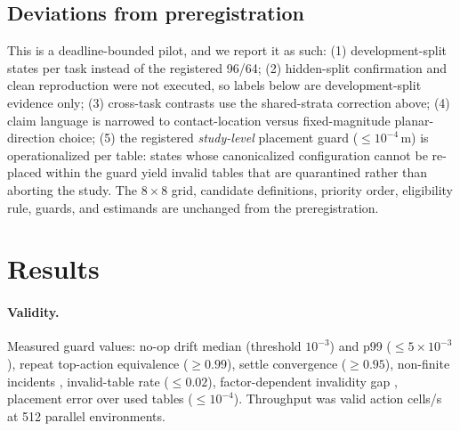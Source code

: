 \documentclass{article}
\begin{document}
\subsection{Deviations from preregistration}
This is a deadline-bounded pilot, and we report it as such:
(1) \nstatespertask{} development-split states per task instead of the
registered 96/64; (2) hidden-split confirmation and clean reproduction were
not executed, so labels below are development-split evidence only;
(3) cross-task contrasts use the shared-strata correction above;
(4) claim language is narrowed to contact-location versus fixed-magnitude
planar-direction choice; (5) the registered \emph{study-level} placement
guard ($\le 10^{-4}$\,m) is operationalized per table: states whose
canonicalized configuration cannot be re-placed within the guard yield
invalid tables that are quarantined rather than aborting the study. The
$8{\times}8$ grid, candidate definitions,
priority order, eligibility rule, guards, and estimands are unchanged from the
preregistration.

\section{Results}
\paragraph{Validity.}
\guardlead{} Measured guard values: no-op drift median \guardnoopmed{}
(threshold $10^{-3}$) and p99 \guardnooppninenine{} ($\le 5{\times}10^{-3}$),
repeat top-action equivalence \guardrepagree{} ($\ge 0.99$), settle
convergence \guardsettle{} ($\ge 0.95$), non-finite incidents
\guardnonfinite{}, invalid-table rate \guardinvrate{} ($\le 0.02$),
factor-dependent invalidity gap \guardfactorgap{}, placement error over used
tables \guardplaceerrused{} ($\le 10^{-4}$).
Throughput was \cellsps{} valid action cells/s at 512 parallel environments.

\begin{table}[t]
\centering\small
\caption{Primary contrast $\Delta_{WH}=\mathbb{E}_s[v_P-v_U]$ per task,
candidate \selcand{}, with studentized max-$t$ simultaneous 95\% intervals
over the three-task family. $n$ = valid states. Labels use the preregistered
rule with minimum effect $0.02$. Pilot scale; development split only.}
\label{tab:primary}
\resizebox{\columnwidth}{!}{\primarytable}
\end{table}

\begin{table}[t]
\centering\small
\caption{Factorial decomposition per task, candidate \selcand{}
(state means, pointwise 95\% bootstrap CIs). $I$ is upward-biased by
noise; compare against the zero-displacement floor
(median \zerodeltamed, p99 \zerodeltapninenine).}
\label{tab:decomp}
\resizebox{\columnwidth}{!}{\decomptable}
\end{table}
\end{document}

